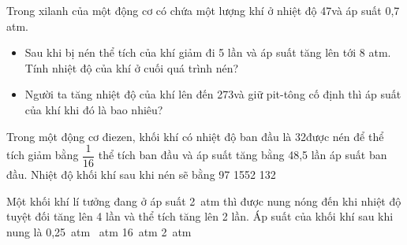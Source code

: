 \begin{ex} %
	Trong xilanh của một động cơ có chứa một lượng khí ở nhiệt độ 47\doC và áp suất 0,7 atm.
	\begin{itemize}
		\item[a)] Sau khi bị nén thể tích của khí giảm đi 5 lần và áp suất tăng lên tới 8 atm. Tính nhiệt độ của khí ở cuối quá trình nén?
		\item[b)] Người ta tăng nhiệt độ của khí lên đến 273\doC và giữ pit-tông cố định thì áp suất của khí khi đó là bao nhiêu?
	\end{itemize}
\end{ex}
\begin{ex} %
	Trong một động cơ điezen, khối khí có nhiệt độ ban đầu là 32\doC được nén để thể tích giảm bằng $\dfrac{1}{16}$ thể tích ban đầu và áp suất tăng bằng 48,5 lần áp suất ban đầu. Nhiệt độ khối khí sau khi nén sẽ bằng
	\choice
	{97\doC}
	{\doC}
	{1552\doC}
	{132\doC}
\end{ex}
\begin{ex} %
	Một khối khí lí tưởng đang ở áp suất 2\ atm thì được nung nóng đến khi nhiệt độ tuyệt đối tăng lên 4 lần và thể tích tăng lên 2 lần. Áp suất của khối khí sau khi nung là
	\choice
	{0,25\ atm}
	{\ atm}
	{16\ atm}
	{2\ atm}
\end{ex}
